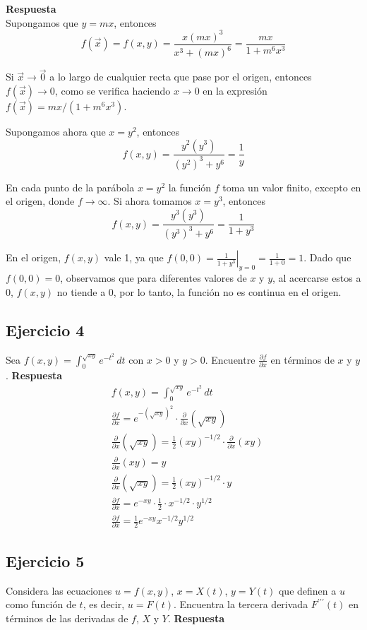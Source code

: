\documentclass{report}
\begin{document}
    \textbf{Respuesta}\\
    Supongamos que $y = m x$, entonces
    $$
    f(\vec{x})=f(x, y)=\frac{x(m x)^3}{x^3+(m x)^6}=\frac{m x}{1+m^6 x^3}
    $$

    Si $\vec{x} \rightarrow \vec{0}$ a lo largo de cualquier recta que pase por el origen, entonces $f(\vec{x}) \rightarrow 0$, como se verifica haciendo $x \rightarrow 0$ en la expresión $f(\vec{x})=m x /\left(1+m^6 x^3\right)$.

    Supongamos ahora que $x=y^2$, entonces
    $$
    f(x, y)=\frac{y^2\left(y^3\right)}{\left(y^2\right)^3+y^6}=\frac{1}{y}
    $$

    En cada punto de la parábola $x=y^2$ la función $f$ toma un valor finito, excepto en el origen, donde $f \rightarrow \infty$. Si ahora tomamos $x=y^3$, entonces
    $$
    f(x, y)=\frac{y^3\left(y^3\right)}{\left(y^3\right)^3+y^6}=\frac{1}{1+y^3}
    $$

    En el origen, $f(x, y)$ vale 1, ya que $f(0,0)=\left.\frac{1}{1+y^3}\right|_{y=0}=\frac{1}{1+0}=1$. Dado que $f(0,0) = 0$, observamos que para diferentes valores de $x$ y $y$, al acercarse estos a $0$, $f(x,y)$ no tiende a $0$, por lo tanto, la función no es continua en el origen.\subsection*{Ejercicio 4}
    Sea $ f(x, y) = \int_{0}^{\sqrt{x y}} e^{-t^2} \, dt $ con $ x > 0 $ y $ y > 0 $. Encuentre $\frac{\partial f}{\partial x}$ en términos de $x$ y $y$.
    \textbf{Respuesta}
    \begin{align*}
    & f(x, y) = \int_0^{\sqrt{x y}} e^{-t^2} \, dt \\
    & \frac{\partial f}{\partial x} = e^{-(\sqrt{x y})^2} \cdot \frac{\partial}{\partial x} \left( \sqrt{x y} \right) \\
    & \frac{\partial}{\partial x} \left( \sqrt{x y} \right) = \frac{1}{2} (x y)^{-1/2} \cdot \frac{\partial}{\partial x} (x y) \\
    & \frac{\partial}{\partial x} (x y) = y \\
    & \frac{\partial}{\partial x} \left( \sqrt{x y} \right) = \frac{1}{2} (x y)^{-1/2} \cdot y \\
    & \frac{\partial f}{\partial x} = e^{-x y} \cdot \frac{1}{2} \cdot x^{-1/2} \cdot y^{1/2} \\
    & \frac{\partial f}{\partial x} = \frac{1}{2} e^{-x y} x^{-1/2} y^{1/2}
    \end{align*}\subsection*{Ejercicio 5}
    Considera las ecuaciones $u=f(x, y)$, $x=X(t)$, $y=Y(t)$ que definen a $u$ como función de $t$, es decir, $u=F(t)$. Encuentra la tercera derivada $F^{\prime \prime \prime}(t)$ en términos de las derivadas de $f$, $X$ y $Y$.
    \textbf{Respuesta}
\end{document}
